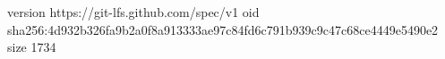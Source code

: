 version https://git-lfs.github.com/spec/v1
oid sha256:4d932b326fa9b2a0f8a913333ae97c84fd6c791b939c9c47c68ce4449e5490e2
size 1734
